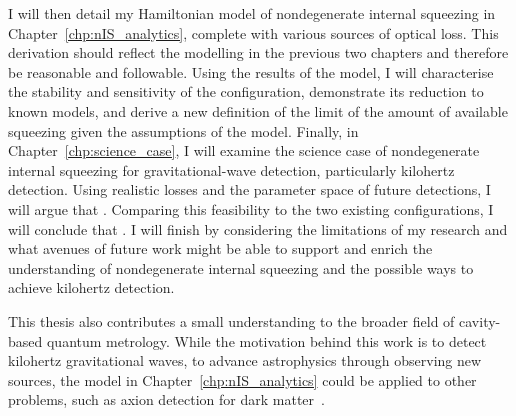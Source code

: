 I will then detail my Hamiltonian model of nondegenerate internal squeezing in Chapter~\ref{chp:nIS_analytics}, complete with various sources of optical loss. This derivation should reflect the modelling in the previous two chapters and therefore be reasonable and followable. Using the results of the model, I will characterise the stability and sensitivity of the configuration, demonstrate its reduction to known models, and derive a new definition of the limit of the amount of available squeezing given the assumptions of the model. Finally, in Chapter~\ref{chp:science_case}, I will examine the science case of nondegenerate internal squeezing for gravitational-wave detection, particularly kilohertz detection. Using realistic losses and the parameter space of future detections, I will argue that . Comparing this feasibility to the two existing configurations, I will conclude that .  I will finish by considering the limitations of my research and what avenues of future work might be able to support and enrich the understanding of nondegenerate internal squeezing and the possible ways to achieve kilohertz detection.

This thesis also contributes a small understanding to the broader field of cavity-based quantum metrology. While the motivation behind this work is to detect kilohertz gravitational waves, to advance astrophysics through observing new sources, the model in Chapter~\ref{chp:nIS_analytics} could be applied to other problems, such as axion detection for dark matter~\cite{}.






